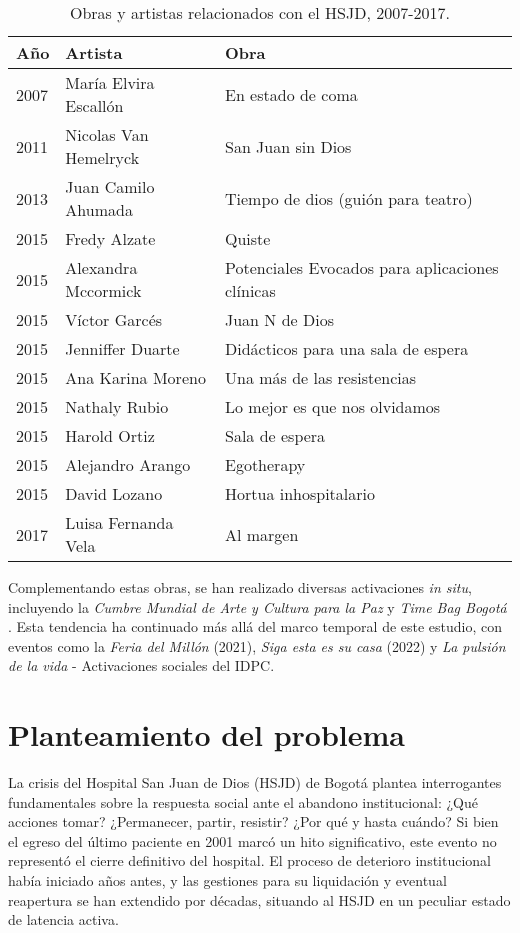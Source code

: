 \begin{table}[htbp]
\centering
\begin{tabular}{|l|l|l|}
\hline
\textbf{Año} & \textbf{Artista} & \textbf{Obra} \\ \hline
2007 & María Elvira Escallón & En estado de coma \\ \hline
2011 & Nicolas Van Hemelryck & San Juan sin Dios \\ \hline
2013 & Juan Camilo Ahumada & Tiempo de dios (guión para teatro) \\ \hline
2015 & Fredy Alzate & Quiste \\ \hline
2015 & Alexandra Mccormick & Potenciales Evocados para aplicaciones clínicas \\ \hline
2015 & Víctor Garcés & Juan N de Dios \\ \hline
2015 & Jenniffer Duarte & Didácticos para una sala de espera \\ \hline
2015 & Ana Karina Moreno & Una más de las resistencias \\ \hline
2015 & Nathaly Rubio & Lo mejor es que nos olvidamos \\ \hline
2015 & Harold Ortiz & Sala de espera \\ \hline
2015 & Alejandro Arango & Egotherapy \\ \hline
2015 & David Lozano & Hortua inhospitalario \\ \hline
2017 & Luisa Fernanda Vela & Al margen \\ \hline
\end{tabular}
\caption{Obras y artistas relacionados con el HSJD, 2007-2017.}
\label{tabla:obras_artistas}
\end{table}

Complementando estas obras, se han realizado diversas activaciones \textit{in situ}, incluyendo la \textit{Cumbre Mundial de Arte y Cultura para la Paz} y \textit{Time Bag Bogotá} \parencite{IDARTES2015}. Esta tendencia ha continuado más allá del marco temporal de este estudio, con eventos como la \textit{Feria del Millón} (2021), \textit{Siga esta es su casa} (2022) y \textit{La pulsión de la vida} - Activaciones sociales del IDPC.

\section*{Planteamiento del problema}

La crisis del Hospital San Juan de Dios (HSJD) de Bogotá plantea interrogantes fundamentales sobre la respuesta social ante el abandono institucional: ¿Qué acciones tomar? ¿Permanecer, partir, resistir? ¿Por qué y hasta cuándo? Si bien el egreso del último paciente en 2001 marcó un hito significativo, este evento no representó el cierre definitivo del hospital. El proceso de deterioro institucional había iniciado años antes, y las gestiones para su liquidación y eventual reapertura se han extendido por décadas, situando al HSJD en un peculiar estado de latencia activa.

